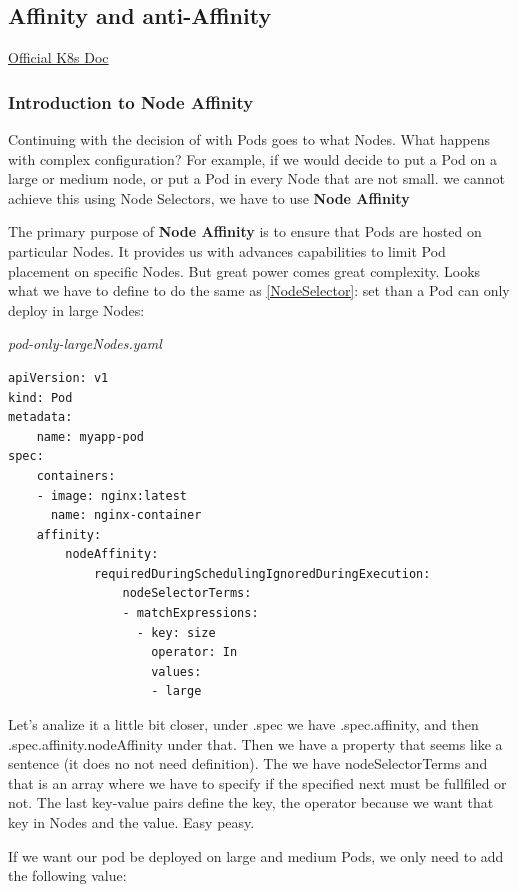 \documentclass{article}
\newenvironment{codetemplate}[1][]{%
  \mybasecolorbox[#1]
  \itshape
}{%
  \endmybasecolorbox
}
\begin{document}
\subsection{Affinity and anti-Affinity}

\href{https://kubernetes.io/docs/concepts/scheduling-eviction/assign-pod-node/}{Official K8s Doc}

\subsubsection{Introduction to Node Affinity}

Continuing with the decision of with Pods goes to what Nodes. What happens with complex configuration? For example, if we would decide to put a Pod on a large or medium node, or put a Pod in every Node that are not small. we cannot achieve this using Node Selectors, we have to use \textbf{Node Affinity}

The primary purpose of \textbf{Node Affinity} is to ensure that Pods are hosted on particular Nodes. It provides us with advances capabilities to limit Pod placement on specific Nodes. But great power comes great complexity. Looks what we have to define to do the same as \ref{NodeSelector}: set than a Pod can only deploy in large Nodes:

\begin{codetemplate}{pod-only-largeNodes.yaml}
\begin{verbatim}
apiVersion: v1
kind: Pod
metadata:
    name: myapp-pod
spec:
    containers:
    - image: nginx:latest
      name: nginx-container
    affinity:
        nodeAffinity:
            requiredDuringSchedulingIgnoredDuringExecution:
                nodeSelectorTerms:
                - matchExpressions:
                  - key: size
                    operator: In
                    values:
                    - large
\end{verbatim}
\end{codetemplate}

Let's analize it a little bit closer, under .spec we have .spec.affinity, and then .spec.affinity.nodeAffinity under that. Then we have a property that seems like a sentence (it does no not need definition). The we have nodeSelectorTerms and that is an array where we have to specify if the specified next must be fullfiled or not. The last key-value pairs define the key, the operator because we want that key in Nodes and the value. Easy peasy.

If we want our pod be deployed on large and medium Pods, we only need to add the following value:
\end{document}
